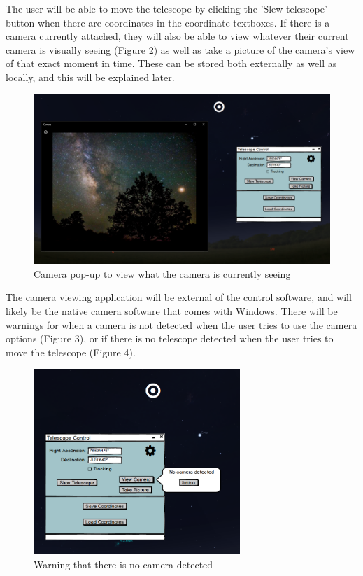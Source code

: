 \documentclass[12pt]{report}
\begin{document}
The user will be able to move the telescope by clicking the 'Slew telescope' button when there are coordinates in the coordinate textboxes. If there is a camera currently attached, they will also be able to view whatever their current camera is visually seeing (Figure 2) as well as take a picture of the camera's view of that exact moment in time. These can be stored both externally as well as locally, and this will be explained later.

\newpage

\begin{figure}[h]
	\centering
	\includegraphics[width=0.90\linewidth]{MainScreenwithCameraView}
	\caption{Camera pop-up to view what the camera is currently seeing}
\end{figure}

The camera viewing application will be external of the control software, and will likely be the native camera software that comes with Windows. There will be warnings for when a camera is not detected when the user tries to use the camera options (Figure 3), or if there is no telescope detected when the user tries to move the telescope (Figure 4).

\begin{figure}[h]
	\centering
	\includegraphics[width=0.70\linewidth, height=7cm]{NoCameraDetected}
	\caption{Warning that there is no camera detected}
\end{figure}
\end{document}
